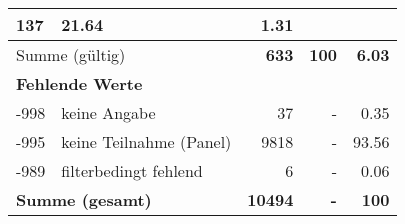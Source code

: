 \begin{longtable}{lXrrr}
       \num{137} &
       \num[round-mode=places,round-precision=2]{21.64} &
         \num[round-mode=places,round-precision=2]{1.31} \\
     \midrule
     \multicolumn{2}{l}{Summe (gültig)} &
       \textbf{\num{633}} &
     \textbf{\num{100}} &
       \textbf{\num[round-mode=places,round-precision=2]{6.03}} \\
     \multicolumn{5}{l}{\textbf{Fehlende Werte}}\\
       -998 &
       keine Angabe &
         \num{37} &
        - &
         \num[round-mode=places,round-precision=2]{0.35} \\
       -995 &
       keine Teilnahme (Panel) &
         \num{9818} &
        - &
         \num[round-mode=places,round-precision=2]{93.56} \\
       -989 &
       filterbedingt fehlend &
         \num{6} &
        - &
         \num[round-mode=places,round-precision=2]{0.06} \\
     \midrule
     \multicolumn{2}{l}{\textbf{Summe (gesamt)}} &
          \textbf{\num{10494}} &
        \textbf{-} &
        \textbf{\num{100}} \\
     \bottomrule
     \end{longtable}
     
